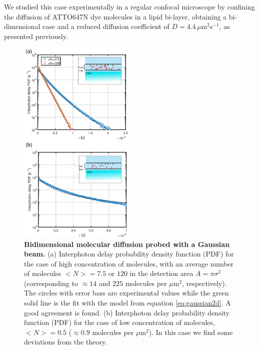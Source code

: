 We studied this case experimentally in a regular confocal microscope 
by confining the diffusion of ATTO647N dye molecules in a lipid bi-layer, 
obtaining a bi-dimensional case and a reduced diffusion coefficient of 
$D=4.4\, \mu$m$^2$s$^{-1}$, as presented previously\cite{Pradhan2016}. 

\begin{figure}
\centering
\includegraphics[width=0.5\textwidth]{2D_gaussian_with_single}%
\caption{\textbf{Bidimensional molecular diffusion probed with a Gaussian beam.} 
(a) Interphoton delay probability density function (PDF) for the case 
of high concentration of molecules, with an average
number of molecules $<N>=7.5$ or $120$ in the detection area 
$A=\pi\sigma^2$ (corresponding to $\approx 14$ and $225$ molecules 
per $\mu$m$^2$, respectively). The circles with error bars are 
experimental values while the green solid line is 
the fit with the model from equation \ref{eq:gaussian2d}. 
A good agreement is found. (b) Interphoton delay probability 
density function (PDF) for the case of low concentration
of molecules, $<N>=0.5$ ($\approx 0.9$ molecules per $\mu$m$^2$). 
In this case we find some deviations
from the theory. 
\label{fg:gaussian2d}}
\end{figure}

